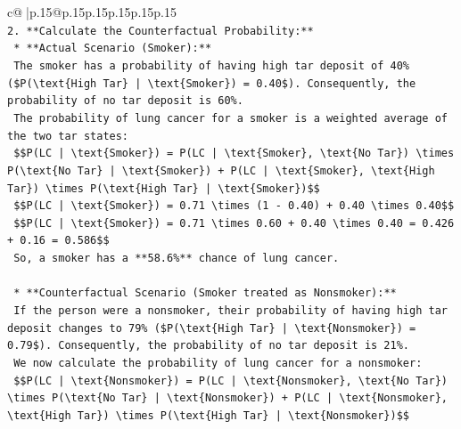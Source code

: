 \documentclass{article}
\begin{document}
{\begin{supertabular}{c@{$\;$}|p{.15\linewidth}@{}p{.15\linewidth}p{.15\linewidth}p{.15\linewidth}p{.15\linewidth}p{.15\linewidth}}
{{{\\ 
\texttt{2.  **Calculate the Counterfactual Probability:**} \\
\texttt{    *   **Actual Scenario (Smoker):**} \\
\texttt{        The smoker has a probability of having high tar deposit of 40\% (\$P(\textbackslash{}text\{High Tar\} | \textbackslash{}text\{Smoker\}) = 0.40\$). Consequently, the probability of no tar deposit is 60\%.} \\
\texttt{        The probability of lung cancer for a smoker is a weighted average of the two tar states:} \\
\texttt{        \$\$P(LC | \textbackslash{}text\{Smoker\}) = P(LC | \textbackslash{}text\{Smoker\}, \textbackslash{}text\{No Tar\}) \textbackslash{}times P(\textbackslash{}text\{No Tar\} | \textbackslash{}text\{Smoker\}) + P(LC | \textbackslash{}text\{Smoker\}, \textbackslash{}text\{High Tar\}) \textbackslash{}times P(\textbackslash{}text\{High Tar\} | \textbackslash{}text\{Smoker\})\$\$} \\
\texttt{        \$\$P(LC | \textbackslash{}text\{Smoker\}) = 0.71 \textbackslash{}times (1 {-} 0.40) + 0.40 \textbackslash{}times 0.40\$\$} \\
\texttt{        \$\$P(LC | \textbackslash{}text\{Smoker\}) = 0.71 \textbackslash{}times 0.60 + 0.40 \textbackslash{}times 0.40 = 0.426 + 0.16 = 0.586\$\$} \\
\texttt{        So, a smoker has a **58.6\%** chance of lung cancer.} \\
\\ 
\texttt{    *   **Counterfactual Scenario (Smoker treated as Nonsmoker):**} \\
\texttt{        If the person were a nonsmoker, their probability of having high tar deposit changes to 79\% (\$P(\textbackslash{}text\{High Tar\} | \textbackslash{}text\{Nonsmoker\}) = 0.79\$). Consequently, the probability of no tar deposit is 21\%.} \\
\texttt{        We now calculate the probability of lung cancer for a nonsmoker:} \\
\texttt{        \$\$P(LC | \textbackslash{}text\{Nonsmoker\}) = P(LC | \textbackslash{}text\{Nonsmoker\}, \textbackslash{}text\{No Tar\}) \textbackslash{}times P(\textbackslash{}text\{No Tar\} | \textbackslash{}text\{Nonsmoker\}) + P(LC | \textbackslash{}text\{Nonsmoker\}, \textbackslash{}text\{High Tar\}) \textbackslash{}times P(\textbackslash{}text\{High Tar\} | \textbackslash{}text\{Nonsmoker\})\$\$} \\
}}}
\end{supertabular}}
\end{document}
